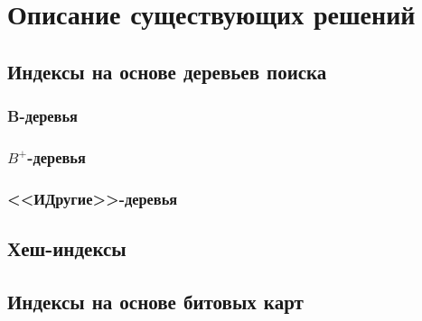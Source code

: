 \chapter{Описание существующих решений}

\section{Индексы на основе деревьев поиска}

\subsection{B-деревья}

\subsection{$B^+$-деревья}

\subsection{<<ИДругие>>-деревья}

\section{Хеш-индексы}

\section{Индексы на основе битовых карт}

